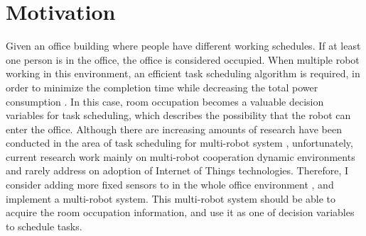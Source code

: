 
\section{Motivation}
Given an office building where people have different working schedules. If at least one person is in the office, the office is considered occupied.
When multiple robot working in this environment, an efficient task scheduling algorithm is required, in order to minimize the completion time while decreasing the total power consumption \cite{Chun12}.
In this case, room occupation becomes a valuable decision variables for task scheduling, which describes the possibility that the robot can enter the office.
Although there are increasing amounts of research have been conducted in the area of task scheduling for multi-robot system \cite{Shah7}, unfortunately, current research work mainly on multi-robot cooperation dynamic environments and rarely address on adoption of Internet of Things technologies. 
Therefore, I consider adding more fixed sensors to in the whole office environment \cite{Coltin10}, and implement a multi-robot system. This multi-robot system should be able to acquire the room occupation information, and use it as one of decision variables to schedule tasks. 













